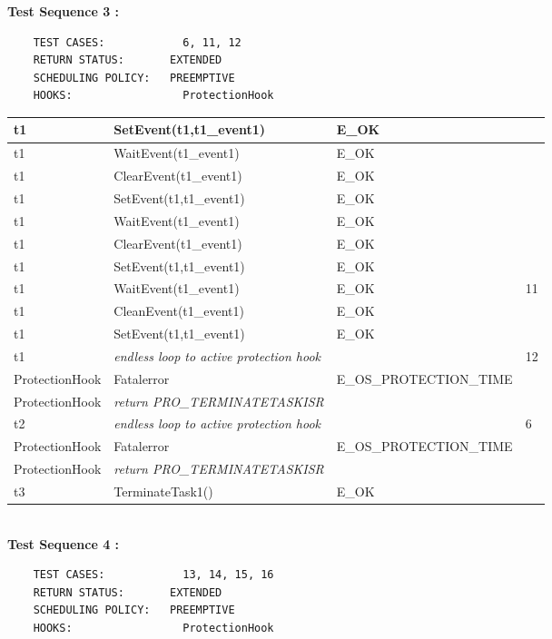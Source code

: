 \documentclass[10pt]{article}
\newlength{\Li}\settowidth{\Li}{Running}
\newlength{\Lii}\setlength{\Lii}{7cm}
\newlength{\Liiii}\setlength{\Liiii}{0.9cm}
\newlength{\Liii}\setlength{\Liii}{\textwidth} \addtolength{\Liii}{-\Li} \addtolength{\Liii}{-\Lii} \addtolength{\Liii}{-\Liiii}
\begin{document}
	\textbf{Test Sequence 3 :}
	\begin{lstlisting}
	TEST CASES:		       6, 11, 12
	RETURN STATUS:	  	 EXTENDED
	SCHEDULING POLICY:   PREEMPTIVE
	HOOKS:		           ProtectionHook
	\end{lstlisting}
	

	\begin{supertabular}{|p{\Li}|p{\Lii}|p{\Liii}|p{\Liiii}|} \hline 
	t1	& SetEvent(t1,t1\_event1)						& E\_OK											& \\ \hline
	t1	& WaitEvent(t1\_event1)							& E\_OK											& \\ \hline
	t1	& ClearEvent(t1\_event1)						& E\_OK											&  \\ \hline
	t1	& SetEvent(t1,t1\_event1)						& E\_OK											& \\ \hline
	t1	& WaitEvent(t1\_event1)							& E\_OK											& \\ \hline
	t1	& ClearEvent(t1\_event1)						& E\_OK											& \\ \hline
	t1	& SetEvent(t1,t1\_event1)						& E\_OK											& \\ \hline
	t1	& WaitEvent(t1\_event1)							& E\_OK											& 11 \\ \hline
	t1	& CleanEvent(t1\_event1)						& E\_OK											& \\ \hline
	t1	& SetEvent(t1,t1\_event1)						& E\_OK											& \\ \hline
	t1	& \textit{endless loop to active protection hook}		& 												& 12 \\ \hline
	ProtectionHook		& Fatalerror					& E\_OS\_PROTECTION\_TIME 						& \\ \hline
	ProtectionHook		& \textit{return PRO\_TERMINATETASKISR}	& & \\ \hline
	t2	& \textit{endless loop to active protection hook}		& 												& 6 \\ \hline
	ProtectionHook		& Fatalerror					& E\_OS\_PROTECTION\_TIME 						& \\ \hline
	ProtectionHook		& \textit{return PRO\_TERMINATETASKISR}	& & \\ \hline
	t3	& TerminateTask1()							& E\_OK											& \\ \hline
	\end{supertabular}\\

	\textbf{Test Sequence 4 :}
	\begin{lstlisting}
	TEST CASES:		       13, 14, 15, 16
	RETURN STATUS:	  	 EXTENDED
	SCHEDULING POLICY:   PREEMPTIVE
	HOOKS:		           ProtectionHook
	\end{lstlisting}
	
\end{document}
